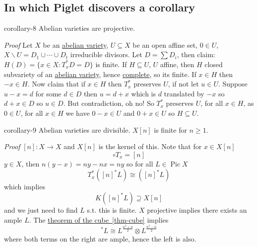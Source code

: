 \documentclass[10pt,]{book}
\makeatletter
\renewcommand*{\proofname}{Proof}
\renewenvironment{proof}[1][\proofname]{\par
  \pushQED{\qed}%
  \normalfont \topsep6\p@\@plus6\p@\relax
  \trivlist
  \item\relax
    {\itshape
    #1\@addpunct{.}}\hspace\labelsep\ignorespaces
}{%
  \popQED\endtrivlist\@endpefalse
}
\numberwithin{equation}{section}
\DeclareMathOperator{\Pic}{Pic}
\makeatother
\begin{document}
\subsection[{In which Piglet discovers a corollary}]{In which Piglet discovers a corollary}\label{subsection-17}
\begin{corollary}{}{}{corollary-8}%
\hypertarget{p-155}{}%
Abelian varieties are projective.%
\end{corollary}
\begin{proof}\hypertarget{proof-29}{}
\hypertarget{p-156}{}%
Let \(X\) be an \hyperref[def-buntes-abvar]{abelian variety}, \(U \subseteq X\) be an open affine set, \(0\in U\), \(X\smallsetminus U = D_1 \cup \cdots \cup D_t\) irreducible divisors. Let \(D = \sum D_i\), then claim: \(H(D) = \{x\in X: T_x^*D  = D \}\) is finite. If \(H\subseteq U\), \(U\) affine, then \(H\) closed subvariety of an \hyperref[def-buntes-abvar]{abelian variety}, hence \hyperref[def-abelian-complete-var]{complete}, so its finite. If \(x\in H\) then \(-x \in H\). Now claim that if \(x\in H\) then \(T_x^*\) preserves \(U\), if not let \(u\in U\). Suppose \(u-x = d\) for some \(d\in D\) then \(u = d+x\) which is \(d\) translated by \(-x\) so \(d+x \in D\) so \(u\in D\). But contradiction, oh no! So \(T_x^*\) preserves \(U\), for all \(x\in H\), as \(0 \in U\), for all \(x\in H\) we have \(0-x \in U\) and  \(0+x\in U\) so \(H\subseteq U\).%
\end{proof}
\begin{corollary}{}{}{corollary-9}%
\hypertarget{p-157}{}%
Abelian varieties are divisible. \(X[n]\) is finite for \(n\ge 1\).%
\end{corollary}
\begin{proof}\hypertarget{proof-30}{}
\hypertarget{p-158}{}%
\([n]\colon X \to X\) and \(X[n]\) is the kernel of this. Note that for \(x\in X[n]\)%
\begin{equation*}
[n]\circ T_x = [n]
\end{equation*}
\(y\in X\), then \(n(y-x) = ny - nx = ny\) so for all \(L \in \Pic X\)%
\begin{equation*}
T_x^*([n]^* L ) \cong ([n]^* L)
\end{equation*}
which implies%
\begin{equation*}
K([n]^* L ) \supseteq X[n]
\end{equation*}
and we just need to find \(L\) s.t. this is finite. \(X\) projective implies there exists an ample \(L\). The \hyperref[thm-cube]{theorem of the cube~\ref{thm-cube}} implies%
\begin{equation*}
[n]^*L \cong L^{\frac{n^2 + n}{2}} \otimes L^{\frac{n^2 - n}{2}}
\end{equation*}
where both terms on the right are ample, hence the left is also.%
\end{proof}
%
%
\typeout{************************************************}
\typeout{************************************************}
%
\end{document}
